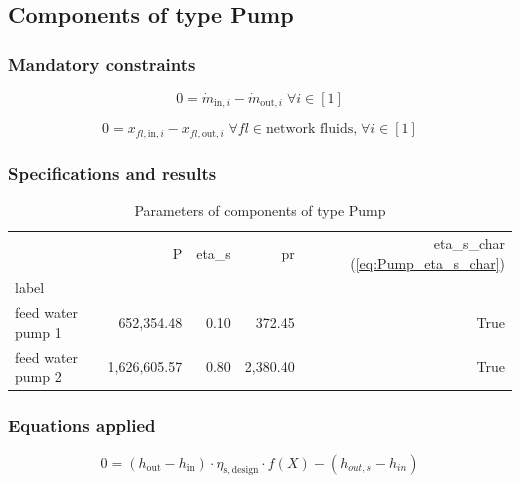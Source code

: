 \documentclass[]{article}
\begin{document}
\subsection{Components of type Pump}

\subsubsection{Mandatory constraints}

\begin{equation}
\label{eq:Pump_mass_flow_constraints}
0=\dot{m}_{\mathrm{in,}i}-\dot{m}_{\mathrm{out,}i}\; \forall i \in [1]
\end{equation}

\begin{equation}
\label{eq:Pump_fluid_constraints}
0=x_{fl\mathrm{,in,}i}-x_{fl\mathrm{,out,}i}\;\forall fl \in\text{network fluids,}\; \forall i \in [1]
\end{equation}


\subsubsection{Specifications and results}

\begin{table}[H]
\centering
\caption{Parameters of components of type Pump}
\begin{tabular}{lrrrr}
\toprule
{} &             P & eta\_s &        pr &  eta\_s\_char (\ref{eq:Pump_eta_s_char}) \\
label             &               &        &           &                                          \\
\midrule
feed water pump 1 &    652,354.48 &   0.10 &    372.45 &                                     True \\
feed water pump 2 &  1,626,605.57 &   0.80 &  2,380.40 &                                     True \\
\bottomrule
\end{tabular}
\end{table}
\subsubsection{Equations applied}

\begin{equation}
\label{eq:Pump_eta_s_char}
0=\left(h_\mathrm{out}-h_\mathrm{in}\right)\cdot\eta_\mathrm{s,design}\cdot f\left( X \right)-\left( h_{out,s} - h_{in} \right)
\end{equation}
\end{document}
